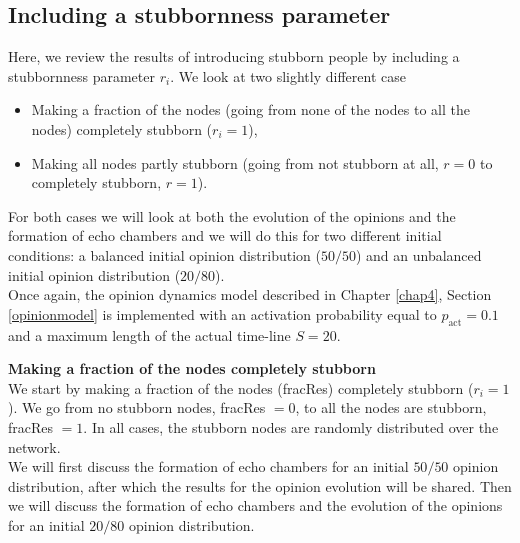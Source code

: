 \documentclass[11 pt , letterpaper , twoside , openright]{book}
\begin{document}
\subsection{Including a stubbornness parameter}
\label{stubbpar}
Here, we review the results of introducing stubborn people by including a stubbornness parameter $r_i$. We look at two slightly different case
\begin{itemize}
	\item Making a fraction of the nodes (going from none of the nodes to all the nodes) completely stubborn ($r_i = 1$),
	\item Making all nodes partly stubborn (going from not stubborn at all, $r = 0$ to completely stubborn, $r = 1$).
\end{itemize}
For both cases we will look at both the evolution of the opinions and the formation of echo chambers and we will do this for two different initial conditions: a balanced initial opinion distribution ($50/50$) and an unbalanced initial opinion distribution ($20/80$). \\
Once again, the opinion dynamics model described in Chapter \ref{chap4}, Section \ref{opinionmodel} is implemented with an activation probability equal to $p_{\text{act}} = 0.1$ and a maximum length of the actual time-line $S = 20$.

\newpage
\noindent
\textbf{Making a fraction of the nodes completely stubborn}\\
\newline
We start by making a fraction of the nodes (fracRes) completely stubborn ($r_i = 1$). We go from no stubborn nodes, fracRes $=0$, to all the nodes are stubborn, fracRes $=1$. In all cases, the stubborn nodes are randomly distributed over the network.\\
We will first discuss the formation of echo chambers for an initial $50/50$ opinion distribution, after which the results for the opinion evolution will be shared. Then we will discuss the formation of echo chambers and the evolution of the opinions for an initial $20/80$ opinion distribution.
\end{document}
